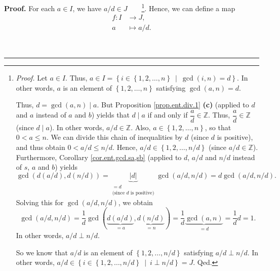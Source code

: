 \documentclass[numbers=enddot,12pt,final,onecolumn,notitlepage]{scrartcl}%
\numberwithin{exer}{subsection}
\theoremstyle{definition}
\newenvironment{proof}[1][Proof]{\noindent\textbf{#1.} }{\ \rule{0.5em}{0.5em}}
\begin{document}
\begin{proof}
For each $a\in I$, we have $a/d\in J$\ \ \ \ \footnote{\textit{Proof.} Let
$a\in I$. Thus, $a\in I=\left\{  i\in\left\{  1,2,\ldots,n\right\}
\ \mid\ \gcd\left(  i,n\right)  =d\right\}  $. In other words, $a$ is an
element of $\left\{  1,2,\ldots,n\right\}  $ satisfying $\gcd\left(
a,n\right)  =d$.
\par
Thus, $d=\gcd\left(  a,n\right)  \mid a$. But Proposition \ref{prop.ent.div.1}
\textbf{(c)} (applied to $d$ and $a$ instead of $a$ and $b$) yields that
$d\mid a$ if and only if $\dfrac{a}{d}\in\mathbb{Z}$. Thus, $\dfrac{a}{d}%
\in\mathbb{Z}$ (since $d\mid a$). In other words, $a/d\in\mathbb{Z}$. Also,
$a\in\left\{  1,2,\ldots,n\right\}  $, so that $0<a\leq n$. We can divide this
chain of inequalities by $d$ (since $d$ is positive), and thus obtain
$0<a/d\leq n/d$. Hence, $a/d\in\left\{  1,2,\ldots,n/d\right\}  $ (since
$a/d\in\mathbb{Z}$). Furthermore, Corollary \ref{cor.ent.gcd.sa,sb} (applied
to $d$, $a/d$ and $n/d$ instead of $s$, $a$ and $b$) yields%
\[
\gcd\left(  d\left(  a/d\right)  ,d\left(  n/d\right)  \right)
=\underbrace{\left\vert d\right\vert }_{\substack{=d\\\text{(since }d\text{ is
positive)}}}\gcd\left(  a/d,n/d\right)  =d\gcd\left(  a/d,n/d\right)  .
\]
Solving this for $\gcd\left(  a/d,n/d\right)  $, we obtain%
\[
\gcd\left(  a/d,n/d\right)  =\dfrac{1}{d}\gcd\left(  \underbrace{d\left(
a/d\right)  }_{=a},\underbrace{d\left(  n/d\right)  }_{=n}\right)  =\dfrac
{1}{d}\underbrace{\gcd\left(  a,n\right)  }_{=d}=\dfrac{1}{d}d=1.
\]
In other words, $a/d\perp n/d$.
\par
So we know that $a/d$ is an element of $\left\{  1,2,\ldots,n/d\right\}  $
satisfying $a/d\perp n/d$. In other words, $a/d\in\left\{  i\in\left\{
1,2,\ldots,n/d\right\}  \ \mid\ i\perp n/d\right\}  =J$. Qed.}. Hence, we can
define a map%
\begin{align*}
f:I  &  \rightarrow J,\\
a  &  \mapsto a/d.
\end{align*}



\end{proof}
\end{document}
